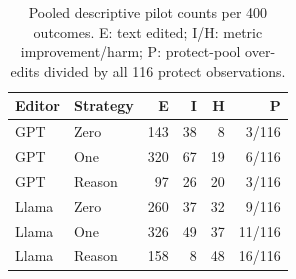 \begin{table}[t]\centering\footnotesize
\caption{Pooled descriptive pilot counts per 400 outcomes. E: text edited; I/H: metric improvement/harm; P: protect-pool over-edits divided by all 116 protect observations.}\label{tab:harm}
\begin{tabular}{llrrrr}\toprule Editor & Strategy & E & I & H & P \\\midrule
GPT & Zero & 143 & 38 & 8 & 3/116 \\
GPT & One & 320 & 67 & 19 & 6/116 \\
GPT & Reason & 97 & 26 & 20 & 3/116 \\
Llama & Zero & 260 & 37 & 32 & 9/116 \\
Llama & One & 326 & 49 & 37 & 11/116 \\
Llama & Reason & 158 & 8 & 48 & 16/116 \\
\bottomrule\end{tabular}\end{table}
